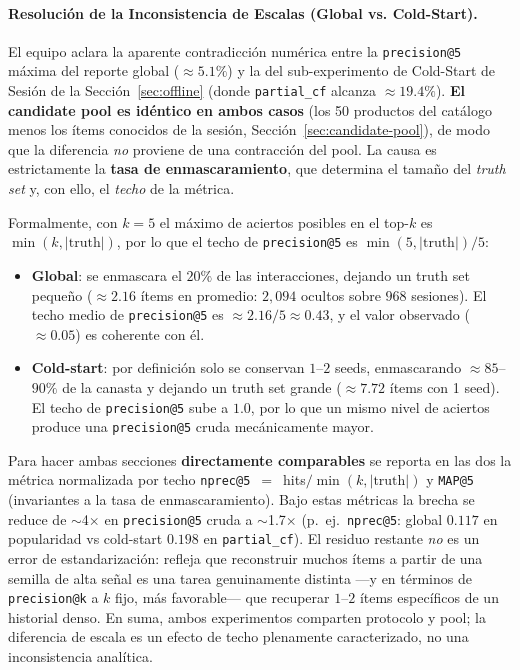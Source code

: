 \documentclass[12pt,a4paper]{article}
\newcommand{\code}[1]{\texttt{\small #1}}
\begin{document}
\paragraph{Resolución de la Inconsistencia de Escalas (Global vs. Cold-Start).} El equipo aclara la aparente contradicción numérica entre la \code{precision@5} máxima del reporte global ($\approx 5.1\%$) y la del sub-experimento de Cold-Start de Sesión de la Sección~\ref{sec:offline} (donde \code{partial\_cf} alcanza $\approx 19.4\%$). \textbf{El candidate pool es idéntico en ambos casos} (los 50 productos del catálogo menos los ítems conocidos de la sesión, Sección~\ref{sec:candidate-pool}), de modo que la diferencia \emph{no} proviene de una contracción del pool. La causa es estrictamente la \textbf{tasa de enmascaramiento}, que determina el tamaño del \emph{truth set} y, con ello, el \emph{techo} de la métrica.

Formalmente, con $k=5$ el máximo de aciertos posibles en el top-$k$ es $\min(k, |\text{truth}|)$, por lo que el techo de \code{precision@5} es $\min(5,|\text{truth}|)/5$:
\begin{itemize}
    \item \textbf{Global}: se enmascara el $20\%$ de las interacciones, dejando un truth set pequeño ($\approx 2.16$ ítems en promedio: $2{,}094$ ocultos sobre $968$ sesiones). El techo medio de \code{precision@5} es $\approx 2.16/5 \approx 0.43$, y el valor observado ($\approx 0.05$) es coherente con él.
    \item \textbf{Cold-start}: por definición solo se conservan $1$--$2$ seeds, enmascarando $\approx 85$--$90\%$ de la canasta y dejando un truth set grande ($\approx 7.72$ ítems con 1 seed). El techo de \code{precision@5} sube a $1.0$, por lo que un mismo nivel de aciertos produce una \code{precision@5} cruda mecánicamente mayor.
\end{itemize}

Para hacer ambas secciones \textbf{directamente comparables} se reporta en las dos la métrica normalizada por techo \code{nprec@5}~$=$~hits$/\min(k,|\text{truth}|)$ y \code{MAP@5} (invariantes a la tasa de enmascaramiento). Bajo estas métricas la brecha se reduce de $\sim$4$\times$ en \code{precision@5} cruda a $\sim$1.7$\times$ (p.~ej.\ \code{nprec@5}: global $0.117$ en popularidad vs cold-start $0.198$ en \code{partial\_cf}). El residuo restante \emph{no} es un error de estandarización: refleja que reconstruir muchos ítems a partir de una semilla de alta señal es una tarea genuinamente distinta —y en términos de \code{precision@k} a $k$ fijo, más favorable— que recuperar $1$--$2$ ítems específicos de un historial denso. En suma, ambos experimentos comparten protocolo y pool; la diferencia de escala es un efecto de techo plenamente caracterizado, no una inconsistencia analítica.
\end{document}
